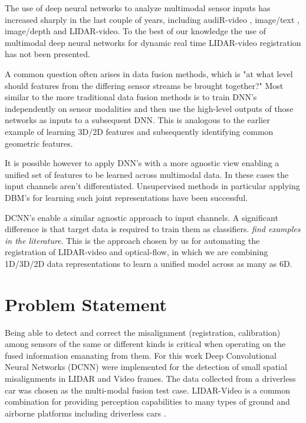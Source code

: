 \documentclass{article}
\begin{document}

The use of deep neural networks to analyze multimodal sensor inputs  has increased sharply in the last couple of years, including audiR-video \cite{Ngiam2011Multimodal} \cite{Kim2013Deep-Learn}, image/text \cite{Srivastava2012Multimodal}, image/depth \cite{Lenz2013Deep-Learn} and LIDAR-video. To the best of our knowledge the use of multimodal deep neural networks for dynamic real time LIDAR-video registration has not been presented.

A common question often arises in data fusion methods, which is "at what level should features from the differing sensor streams be brought together?" Most similar to the more traditional data fusion methods is to train DNN's independently on sensor modalities and then use the high-level outputs of those networks as inputs to a subsequent DNN. This is analogous to the earlier example of learning 3D/2D features and subsequently identifying common geometric features. 

It is possible however to apply DNN's with a more agnostic view enabling a unified set of features to be learned across multimodal data. In these cases the input channels aren't differentiated. Unsupervised methods in particular applying DBM's for learning such joint representations have been successful.  

DCNN's enable a similar agnostic approach to input channels. A significant difference is that target data is required to train them as classifiers. \emph{find examples in the literature}. This is the approach chosen by us for automating the registration of LIDAR-video and optical-flow, in which we are combining 1D/3D/2D data representations to learn a unified model across as many as 6D. 




\section{Problem Statement} %
\label{sec:problem_statement}

Being able to detect and correct the misalignment (registration, calibration) among sensors of the same or different kinds is critical when operating on the fused information emanating from them. For this work Deep Convolutional Neural Networks (DCNN) were implemented for the detection of small spatial misalignments in LIDAR and Video frames. The data collected from a driverless car was chosen as the multi-modal fusion test case. LIDAR-Video is a common combination for providing perception capabilities to many types of ground and airborne platforms including driverless cars \cite{Thrun2011Googles-dr}. 
\end{document}
